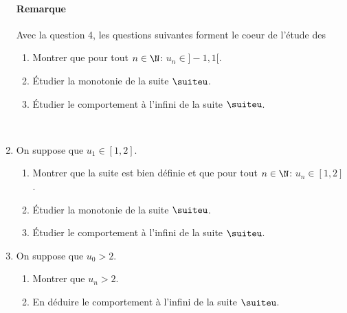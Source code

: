 \documentclass[a4paper, 11pt]{article}
\begin{document}
\begin{enumerate}
\paragraph{Remarque} Avec la question 4, les questions suivantes forment le coeur de l'étude des 
\begin{enumerate}
\item Montrer que pour tout $n\in\N$: $u_n\in\rbrack -1,1\lbrack$.
\item \'Etudier la monotonie de la suite $\suiteu$.
\item \'Etudier le comportement \`{a} l'infini de la suite $\suiteu$.
\end{enumerate}
\
\newpage
\item On suppose que $u_1\in[1,2]$.
\begin{enumerate}
\item Montrer que la suite est bien d\'efinie et que pour tout $n\in\N$: $u_n\in [1,2]$.
\item \'Etudier la monotonie de la suite $\suiteu$.
\item \'Etudier le comportement \`{a} l'infini de la suite $\suiteu$.
\end{enumerate} 
\item On suppose que $u_0>2$.
\begin{enumerate}
\item Montrer que $u_n>2$.
\item En d\'eduire le comportement \`{a} l'infini de la suite $\suiteu$.
\end{enumerate} 
\end{enumerate}
\end{document}

